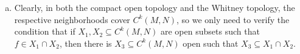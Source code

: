 \documentclass[10pt]{mypackage}
\begin{document}
\begin{solution}\hfill
  \begin{enumerate}[(a)]
    \item Clearly, in both the compact open topology and the Whitney topology, the respective neighborhoods cover $C^{k}\left( M,N \right)$, so we only need to verify the condition that if $X_1,X_2\subseteq C^{k}\left( M,N \right)$ are open subsets such that $f\in X_1\cap X_2$, then there is $X_3\subseteq C^{k}\left( M,N \right)$ open such that $X_3\subseteq X_1\cap X_2$.\newline

  \end{enumerate}
\end{solution}
\end{document}
